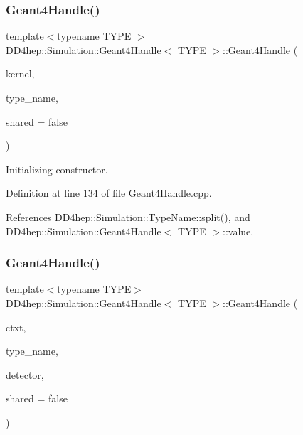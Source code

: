 \subsubsection{\texorpdfstring{Geant4\+Handle()}{Geant4Handle()}\hspace{0.1cm}{\footnotesize\ttfamily [6/20]}}
{\footnotesize\ttfamily template$<$typename T\+Y\+PE $>$ \\
\hyperlink{class_d_d4hep_1_1_simulation_1_1_geant4_handle}{D\+D4hep\+::\+Simulation\+::\+Geant4\+Handle}$<$ T\+Y\+PE $>$\+::\hyperlink{class_d_d4hep_1_1_simulation_1_1_geant4_handle}{Geant4\+Handle} (\begin{DoxyParamCaption}\item[{\hyperlink{class_d_d4hep_1_1_simulation_1_1_geant4_kernel}{Geant4\+Kernel} \&}]{kernel,  }\item[{const std\+::string \&}]{type\+\_\+name,  }\item[{bool}]{shared = {\ttfamily false} }\end{DoxyParamCaption})}



Initializing constructor. 



Definition at line 134 of file Geant4\+Handle.\+cpp.



References D\+D4hep\+::\+Simulation\+::\+Type\+Name\+::split(), and D\+D4hep\+::\+Simulation\+::\+Geant4\+Handle$<$ T\+Y\+P\+E $>$\+::value.

\hypertarget{class_d_d4hep_1_1_simulation_1_1_geant4_handle_a8a80a9a11de03a890561185f4e45ba18}{}\label{class_d_d4hep_1_1_simulation_1_1_geant4_handle_a8a80a9a11de03a890561185f4e45ba18} 
\subsubsection{\texorpdfstring{Geant4\+Handle()}{Geant4Handle()}\hspace{0.1cm}{\footnotesize\ttfamily [7/20]}}
{\footnotesize\ttfamily template$<$typename T\+Y\+PE$>$ \\
\hyperlink{class_d_d4hep_1_1_simulation_1_1_geant4_handle}{D\+D4hep\+::\+Simulation\+::\+Geant4\+Handle}$<$ T\+Y\+PE $>$\+::\hyperlink{class_d_d4hep_1_1_simulation_1_1_geant4_handle}{Geant4\+Handle} (\begin{DoxyParamCaption}\item[{\hyperlink{class_d_d4hep_1_1_simulation_1_1_geant4_kernel}{Geant4\+Kernel} \&}]{ctxt,  }\item[{const std\+::string \&}]{type\+\_\+name,  }\item[{const std\+::string \&}]{detector,  }\item[{bool}]{shared = {\ttfamily false} }\end{DoxyParamCaption})}




